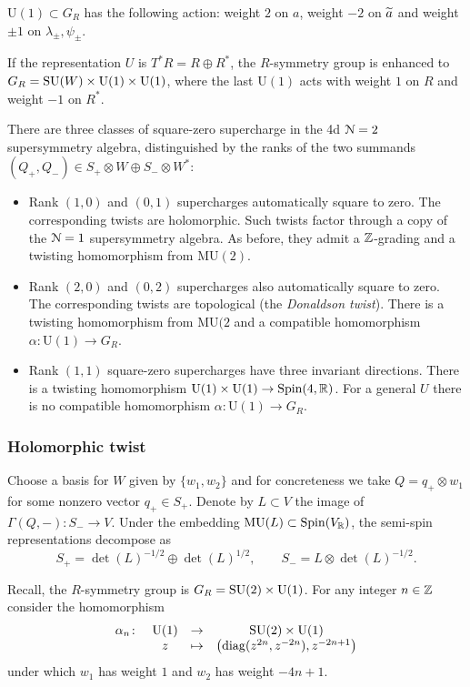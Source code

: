 \documentclass[10pt, oneside]{article}
\newcommand{\MU}{\mathrm{MU}}
\renewcommand{\U}{\mathrm{U}}
\begin{document}
$\U(1)\subset G_R$ has the following action: weight $2$ on $a$, weight $-2$ on $\widetilde{a}$ and weight $\pm 1$ on $\lambda_\pm,\psi_\pm$.

If the representation $U$ is $T^*R = R\oplus R^*$, the $R$-symmetry group is enhanced to $G_R=\SU(W)\times \U(1)\times \U(1)$, where the last $\U(1)$ acts with weight $1$ on $R$ and weight $-1$ on $R^*$.

There are three classes of square-zero supercharge in the 4d $\mathcal{N}=2$ supersymmetry algebra, distinguished by the ranks of the two summands $(Q_+,Q_-) \in S_+ \otimes W \oplus S_- \otimes W^*$:
\begin{itemize}
 \item Rank $(1,0)$ and $(0,1)$ supercharges automatically square to zero.  
 The corresponding twists are holomorphic.
 Such twists factor through a copy of the $\mathcal N = 1$ supersymmetry algebra. As before, they admit a $\mathbb Z$-grading and a twisting homomorphism from $\MU(2)$.
 \item Rank $(2,0)$ and $(0,2)$ supercharges also automatically square to zero. The corresponding twists are topological (the \emph{Donaldson twist}). There is a twisting homomorphism from $\MU(2$ and a compatible homomorphism $\alpha\colon \U(1)\rightarrow G_R$.
 \item Rank $(1,1)$ square-zero supercharges have three invariant directions. There is a twisting homomorphism $\U(1)\times \U(1)\rightarrow \Spin(4, \RR)$. For a general $U$ there is no compatible homomorphism $\alpha\colon \U(1)\rightarrow G_R$.
\end{itemize}

\subsubsection{Holomorphic twist}
\label{sect:4d_2_holomorphictwist}

Choose a basis for $W$ given by $\{w_1, w_2\}$ and for concreteness we take $Q=q_+ \otimes w_1$ for some nonzero vector $q_+ \in S_+$. Denote by $L\subset V$ the image of $\Gamma(Q, -)\colon S_-\rightarrow V$. Under the embedding $\MU(L) \subset \Spin(V_\RR)$, the semi-spin representations decompose as
\[
S_+ = \det(L)^{-1/2} \oplus \det(L)^{1/2},\qquad S_- = L \otimes \det(L)^{-1/2} .
\]

Recall, the $R$-symmetry group is $G_R = \SU(2) \times \U(1)$.
For any integer $n\in\mathbb Z$ consider the homomorphism 
\[
\begin{array}{ccccc}
\alpha_n \colon & \U(1) & \rightarrow & \SU(2)\times \U(1)\\
&  z & \mapsto & \left({\rm diag}(z^{2n}, z^{-2n}) , z^{-2n+1} \right)
\end{array}
\]
under which $w_1$ has weight $1$ and $w_2$ has weight $-4n+1$.
\end{document}

